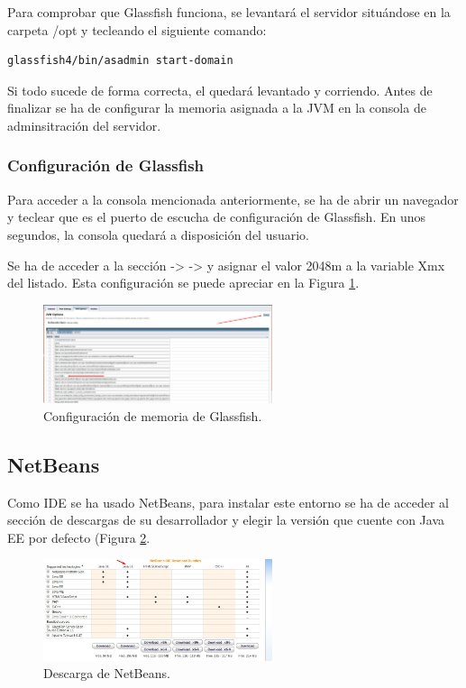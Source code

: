 Para comprobar que Glassfish funciona, se levantará el servidor situándose en la carpeta /opt y tecleando el siguiente comando:
\begin{lstlisting}[language=bash]
	glassfish4/bin/asadmin start-domain
\end{lstlisting}

Si todo sucede de forma correcta, el  quedará levantado y corriendo. Antes de finalizar se ha de configurar la memoria asignada a la JVM en la consola de adminsitración del servidor.

\subsubsection{Configuración de Glassfish}
Para acceder a la consola mencionada anteriormente, se ha de abrir un navegador y teclear  que es el puerto de escucha de configuración de Glassfish. En unos segundos, la consola quedará a disposición del usuario.

Se ha de acceder a la sección  ->  ->  y asignar el valor 2048m a la variable Xmx del listado. Esta configuración se puede apreciar en la Figura \ref{glassconfig}.

\begin{figure}[h]
  \centering
    \includegraphics[width=0.6\textwidth]{../img/instalacion/glassconfig.jpg}
  \caption{Configuración de memoria de Glassfish.}
  \label{glassconfig}
\end{figure}



\subsection{NetBeans}
Como IDE se ha usado NetBeans, para instalar este entorno se ha de acceder al sección de descargas de su desarrollador y elegir la versión que cuente con Java EE por defecto (Figura \ref{descnet}.

\begin{figure}[h]
  \centering
    \includegraphics[width=0.6\textwidth]{../img/instalacion/descnet.jpg}
  \caption{Descarga de NetBeans.}
  \label{descnet}
\end{figure}

